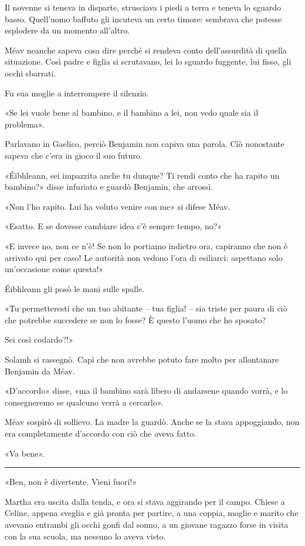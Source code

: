 \documentclass[a4paper,11pt,oneside,openright,final]{memoir}
\begin{document}
Il novenne si teneva in disparte, strusciava i piedi a terra e teneva lo sguardo
basso. Quell'uomo baffuto gli incuteva un certo timore: sembrava che potesse
esplodere da un momento all'altro.

Méav neanche sapeva cosa dire perché si rendeva conto dell'assurdità di
quella situazione. Così padre e figlia si scrutavano, lei lo sguardo fuggente,
lui fisso, gli occhi sbarrati.

Fu sua moglie a interrompere il silenzio.

«Se lei vuole bene al bambino, e il bambino a lei, non vedo quale sia il
problema».

Parlavano in Gaelico, perciò Benjamin non capiva una parola. Ciò nonostante
sapeva che c'era in gioco il suo futuro.

«Éibhleann, sei impazzita anche tu dunque? Ti rendi conto che ha rapito un
bambino?» disse infuriato e guardò Benjamin, che arrossì.

«Non l'ho rapito. Lui ha voluto venire con me» si difese Méav.

«Esatto. E se dovesse cambiare idea c'è sempre tempo, no?»

«E invece no, non ce n'è! Se non lo portiamo indietro ora, capiranno che non
è arrivato qui per caso! Le autorità non vedono l'ora di esiliarci: aspettano
solo un'occasione come questa!»

Éibhleann gli posò le mani sulle spalle.

«Tu permetteresti che un tuo abitante -- tua figlia! -- sia triste per paura
di ciò che potrebbe succedere se non lo fosse? È questo l'uomo che ho sposato?

Sei così codardo?!»

Solamh si rassegnò. Capì che non avrebbe potuto fare molto per allontanare
Benjamin da Méav.

«D'accordo» disse, «ma il bambino sarà libero di andarsene quando vorrà, e
lo consegneremo se qualcuno verrà a cercarlo».

Méav sospirò di sollievo. La madre la guardò. Anche se la stava appoggiando,
non era completamente d'accordo con ciò che aveva fatto.

«Va bene».

\plainbreak{1}

«Ben, non è divertente. Vieni fuori!»

Martha era uscita dalla tenda, e ora si stava aggirando per il campo. Chiese a
Celine, appena sveglia e già pronta per partire, a una coppia, moglie e marito
che avevano entrambi gli occhi gonfi dal sonno, a un giovane ragazzo forse in
visita con la sua scuola, ma nessuno lo aveva visto.
\end{document}
